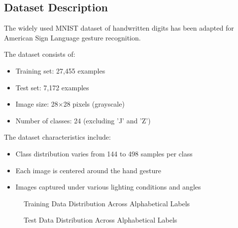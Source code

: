 \documentclass[times,final,english]{revdetua}
\begin{document}
\subsection{Dataset Description}
The widely used MNIST dataset of handwritten digits \cite{lecun} has been adapted for American Sign Language gesture recognition.

The dataset consists of:

\begin{itemize}
    \item Training set: 27,455 examples
    \item Test set: 7,172 examples
    \item Image size: 28×28 pixels (grayscale)
    \item Number of classes: 24 (excluding 'J' and 'Z')
\end{itemize}

The dataset characteristics include:
\begin{itemize}
    \item Class distribution varies from 144 to 498 samples per class
    \item Each image is centered around the hand gesture
    \item Images captured under various lighting conditions and angles
\end{itemize}


\begin{figure}[h!]
\centering
{}
\caption{Training Data Distribution Across Alphabetical Labels}
\label{fig:training_data_distribution}
\end{figure}

\begin{figure}[h!]
\centering
{}
\caption{Test Data Distribution Across Alphabetical Labels}
\label{fig:test_data_distribution}
\end{figure}
\end{document}
